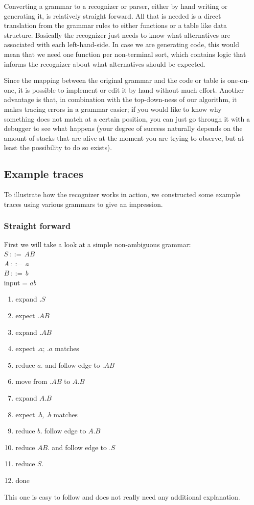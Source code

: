 \documentclass[a4paper,10pt]{article}
\begin{document}
Converting a grammar to a recognizer or parser, either by hand writing or generating it, is relatively straight forward. All that is needed is a direct translation from the grammar rules to either functions or a table like data structure. Basically the recognizer just needs to know what alternatives are associated with each left-hand-side. In case we are generating code, this would mean that we need one function per non-terminal sort, which contains logic that informs the recognizer about what alternatives should be expected.

Since the mapping between the original grammar and the code or table is one-on-one, it is possible to implement or edit it by hand without much effort. Another advantage is that, in combination with the top-down-ness of our algorithm, it makes tracing errors in a grammar easier; if you would like to know why something does not match at a certain position, you can just go through it with a debugger to see what happens (your degree of success naturally depends on the amount of stacks that are alive at the moment you are trying to observe, but at least the possibility to do so exists).

\subsection{Example traces}

To illustrate how the recognizer works in action, we constructed some example traces using various grammars to give an impression.

\subsubsection{Straight forward}
First we will take a look at a simple non-ambiguous grammar:\\
$S\,::=\,AB$\\
$A\,::=\,a$\\
$B\,::=\,b$\\
input = $ab$

\begin{enumerate}
 \setlength{\itemsep}{0pt}
 \setlength{\parskip}{0pt}
 \setlength{\parsep}{0pt}
 
 \item expand $.S$
 \item expect $.AB$
 \item expand $.AB$
 \item expect $.a$; $.a$ matches
 \item reduce $a.$ and follow edge to $.AB$
 \item move from $.AB$ to $A.B$
 \item expand $A.B$
 \item expect $.b$, $.b$ matches
 \item reduce $b.$ follow edge to $A.B$
 \item reduce $AB.$ and follow edge to $.S$
 \item reduce $S.$
 \item done
\end{enumerate}
This one is easy to follow and does not really need any additional explanation.
\end{document}
